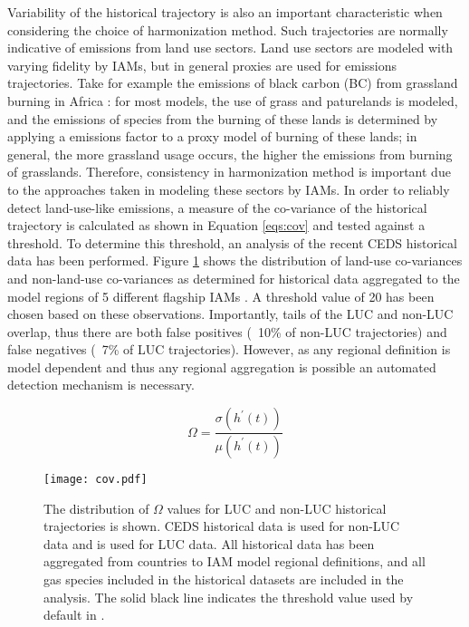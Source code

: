 Variability of the historical trajectory is also an important characteristic
when considering the choice of harmonization method. Such trajectories are
normally indicative of emissions from land use sectors. Land use sectors are
modeled with varying fidelity by IAMs, but in general proxies are used for
emissions trajectories. Take for example the emissions of black carbon (BC) from
grassland burning in Africa : for most
models, the use of grass and paturelands is modeled, and the emissions of
species from the burning of these lands is determined by applying a emissions
factor to a proxy model of burning of these lands; in general, the more
grassland usage occurs, the higher the emissions from burning of
grasslands. Therefore, consistency in harmonization method is important due to
the approaches taken in modeling these sectors by IAMs. In order to reliably
detect land-use-like emissions, a measure of the co-variance of the historical
trajectory is calculated as shown in Equation \ref{eqs:cov} and tested against a
threshold. To determine this threshold, an analysis of the recent CEDS
 historical data has been performed. Figure \ref{fig:cov}
shows the distribution of land-use co-variances and non-land-use co-variances as
determined for historical data aggregated to the model regions of 5 different
flagship IAMs . A threshold value of 20 has been chosen
based on these observations. Importantly, tails of the LUC and non-LUC overlap,
thus there are both false positives (~10\% of non-LUC trajectories) and false
negatives (~7\% of LUC trajectories). However, as any regional definition is
model dependent and thus any regional aggregation is possible an automated
detection mechanism is necessary.

\begin{equation}\label{eqs:cov}
    \Omega =  \frac{\sigma(h^{\prime}(t))}{\mu(h^{\prime}(t))}
\end{equation}


\begin{figure}
  \begin{center}
    \texttt{[image: cov.pdf]}
    \caption[]{
      \label{fig:cov}
      The distribution of $\Omega$ values for LUC and non-LUC historical
      trajectories is shown. CEDS historical data is used for non-LUC data and
       is used for LUC data. All historical data has been
      aggregated from countries to IAM model regional definitions, and all gas
      species included in the historical datasets are included in the
      analysis. The solid black line indicates the threshold value used by
      default in .  
    }
  \end{center}
\end{figure}

